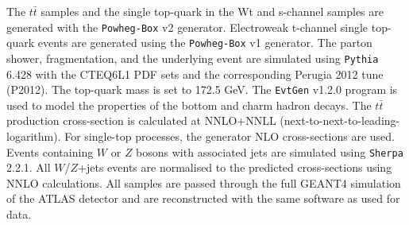 \documentclass[letterpaper,12pt]{article}
\begin{document}
The $t\bar{t}$ samples and the single top-quark in the Wt 
and s-channel samples are generated with the {\tt Powheg-Box} v2 \cite{powheg} 
generator. Electroweak t-channel single top-quark events are generated 
using the {\tt Powheg-Box} v1 generator. The parton shower, fragmentation, 
and the underlying event are simulated using {\tt Pythia} 6.428\cite{pythia} 
with the CTEQ6L1 PDF sets and the corresponding Perugia 2012 tune (P2012)\cite{perugia}. 
The top-quark mass is set to 172.5 GeV. The {\tt EvtGen} v1.2.0 program \cite{evtgen} 
is used to model the properties of the bottom and charm hadron decays. 
The $t\bar{t}$ production cross-section is calculated at NNLO+NNLL 
(next-to-next-to-leading-logarithm)\cite{NNLO}. For single-top processes, 
the generator NLO cross-sections are used. Events containing $W$ or $Z$ 
bosons with associated jets are simulated using {\tt Sherpa} 2.2.1\cite{sherpa}. 
All $W$/$Z$+jets events are normalised to the predicted cross-sections using 
NNLO calculations. All samples are passed through the full GEANT4\cite{GEANT4} 
simulation of the ATLAS detector and are reconstructed with the same software as used for data.
\end{document}
